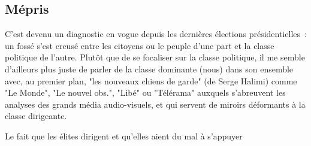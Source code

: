 
\subsection*{Mépris}

C'est devenu un diagnostic en vogue depuis les
dernières élections présidentielles~: un fossé s'est creusé
entre les citoyens ou le peuple d'une part et la classe politique de l'autre.
Plutôt que de se focaliser sur la classe politique, il me semble d'ailleurs
plus juste de parler de la classe dominante (nous) dans son ensemble
avec, au premier plan, "les nouveaux chiens de garde" (de Serge Halimi)
comme "Le Monde", "Le nouvel obs.", "Libé" ou "Télérama"
auxquels s'abreuvent les analyses des grands média audio-visuels,
et qui servent de miroirs déformants à la classe dirigeante.

Le fait que les élites dirigent et qu'elles aient du mal à s'appuyer
